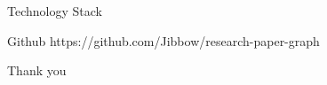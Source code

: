 \documentclass{beamer}
\begin{document}
\begin{frame}{Technology Stack}
\end{frame}

\begin{frame}{Github}
    https://github.com/Jibbow/research-paper-graph
\end{frame}

\begin{frame}{Thank you}
\end{frame}
\end{document}
